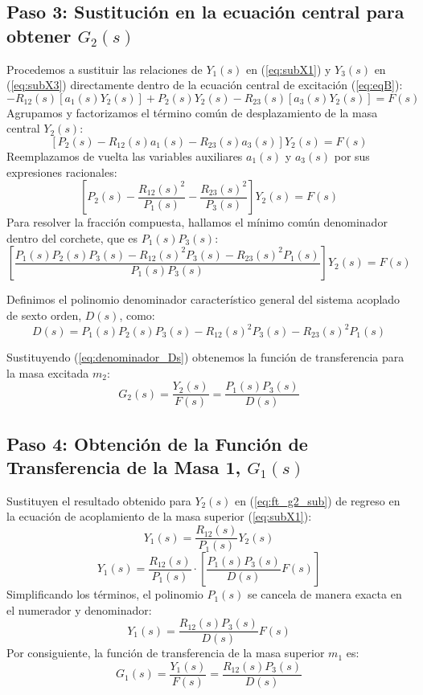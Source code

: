 \documentclass[12pt,letterpaper]{article}
\begin{document}
\subsection{Paso 3: Sustitución en la ecuación central para obtener $G_2(s)$}
Procedemos a sustituir las relaciones de $Y_1(s)$ en (\ref{eq:subX1}) y $Y_3(s)$ en (\ref{eq:subX3}) directamente dentro de la ecuación central de excitación (\ref{eq:eqB}):
\[ -R_{12}(s) \left[ a_1(s) Y_2(s) \right] + P_2(s) Y_2(s) - R_{23}(s) \left[ a_3(s) Y_2(s) \right] = F(s) \]
Agrupamos y factorizamos el término común de desplazamiento de la masa central $Y_2(s)$:
\begin{equation}
\left[ P_2(s) - R_{12}(s)a_1(s) - R_{23}(s)a_3(s) \right] Y_2(s) = F(s)
\label{eq:eqCentralFactorizada}
\end{equation}
Reemplazamos de vuelta las variables auxiliares $a_1(s)$ y $a_3(s)$ por sus expresiones racionales:
\[ \left[ P_2(s) - \frac{R_{12}(s)^2}{P_1(s)} - \frac{R_{23}(s)^2}{P_3(s)} \right] Y_2(s) = F(s) \]
Para resolver la fracción compuesta, hallamos el mínimo común denominador dentro del corchete, que es $P_1(s)P_3(s)$:
\[ \left[ \frac{P_1(s)P_2(s)P_3(s) - R_{12}(s)^2 P_3(s) - R_{23}(s)^2 P_1(s)}{P_1(s)P_3(s)} \right] Y_2(s) = F(s) \]

Definimos el polinomio denominador característico general del sistema acoplado de sexto orden, $D(s)$, como:
\begin{equation}
D(s) = P_1(s)P_2(s)P_3(s) - R_{12}(s)^2 P_3(s) - R_{23}(s)^2 P_1(s)
\label{eq:denominador_Ds}
\end{equation}

Sustituyendo (\ref{eq:denominador_Ds}) obtenemos la función de transferencia para la masa excitada $m_2$:
\begin{equation}
G_2(s) = \frac{Y_2(s)}{F(s)} = \frac{P_1(s)P_3(s)}{D(s)}
\label{eq:ft_g2_sub}
\end{equation}

\subsection{Paso 4: Obtención de la Función de Transferencia de la Masa 1, $G_1(s)$}
Sustituyen el resultado obtenido para $Y_2(s)$ en (\ref{eq:ft_g2_sub}) de regreso en la ecuación de acoplamiento de la masa superior (\ref{eq:subX1}):
\[ Y_1(s) = \frac{R_{12}(s)}{P_1(s)} Y_2(s) \]
\[ Y_1(s) = \frac{R_{12}(s)}{P_1(s)} \cdot \left[ \frac{P_1(s)P_3(s)}{D(s)} F(s) \right] \]
Simplificando los términos, el polinomio $P_1(s)$ se cancela de manera exacta en el numerador y denominador:
\[ Y_1(s) = \frac{R_{12}(s)P_3(s)}{D(s)} F(s) \]
Por consiguiente, la función de transferencia de la masa superior $m_1$ es:
\begin{equation}
G_1(s) = \frac{Y_1(s)}{F(s)} = \frac{R_{12}(s)P_3(s)}{D(s)}
\label{eq:ft_g1_sub}
\end{equation}
\end{document}
